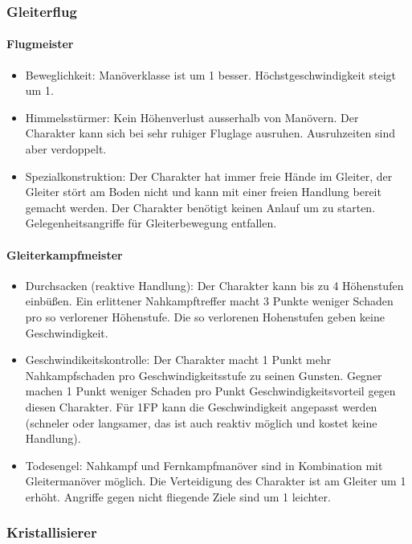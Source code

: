 \documentclass{article}
\begin{document}
\subsubsection{Gleiterflug}

\paragraph{Flugmeister}

\begin{itemize}
\item Beweglichkeit: Manöverklasse ist um 1 besser. Höchstgeschwindigkeit steigt um 1.
\item Himmelsstürmer: Kein Höhenverlust ausserhalb von Manövern. Der Charakter kann sich bei sehr ruhiger Fluglage ausruhen. Ausruhzeiten sind aber verdoppelt.
\item Spezialkonstruktion: Der Charakter hat immer freie Hände im Gleiter, der Gleiter stört am Boden nicht und kann mit einer freien Handlung bereit gemacht werden. Der Charakter benötigt keinen Anlauf um zu starten. Gelegenheitsangriffe für Gleiterbewegung entfallen.
\end{itemize}

\paragraph{Gleiterkampfmeister}

\begin{itemize}
\item Durchsacken (reaktive Handlung): Der Charakter kann bis zu 4 Höhenstufen einbüßen. Ein erlittener Nahkampftreffer macht 3 Punkte weniger Schaden pro so verlorener Höhenstufe. Die so verlorenen Hohenstufen geben keine Geschwindigkeit.
\item Geschwindikeitskontrolle: Der Charakter macht 1 Punkt mehr Nahkampfschaden pro Geschwindigkeitsstufe zu seinen Gunsten. Gegner machen 1 Punkt weniger Schaden pro Punkt Geschwindigkeitsvorteil gegen diesen Charakter. Für 1FP kann die Geschwindigkeit angepasst werden (schneler oder langsamer, das ist auch reaktiv möglich und kostet keine Handlung).
\item Todesengel: Nahkampf und Fernkampfmanöver sind in Kombination mit Gleitermanöver möglich. Die Verteidigung des Charakter ist am Gleiter um 1 erhöht. Angriffe gegen nicht fliegende Ziele sind um 1 leichter.
\end{itemize}

\subsubsection{Kristallisierer}
\end{document}
